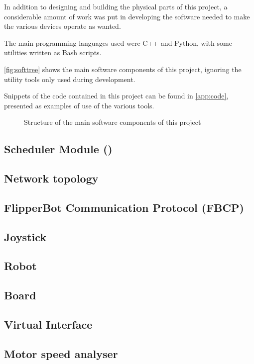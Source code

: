 In addition to designing and building the physical parts of this
project, a considerable amount of work was put in developing the
software needed to make the various devices operate as wanted.

The main programming languages used were C++ and Python, with some
utilities written as Bash scripts.

\autoref{fig:softtree} shows the main software components of this project,
ignoring the utility tools only used during development.

Snippets of the code contained in this project can be found in
\autoref{app:code}, presented as examples of use of the various tools.

\begin{figure}[htbp]
  
  \caption{Structure of the main software components of this project}
  \label{fig:softtree}
\end{figure}

\subsection{Scheduler Module (\ScheMo{})}
  \label{ssec:schemo}
  

\subsection{Network topology}
  \label{ssec:network}
  

\subsection{FlipperBot Communication Protocol (FBCP)}
  \label{ssec:fbcp}
  
  
\subsection{Joystick}
  \label{ssec:contr}
  

\subsection{Robot}
  \label{ssec:robot}
  

\subsection{Board}
  \label{ssec:board}
  
  
\subsection{Virtual Interface}
  \label{ssec:vcontr}
  

\subsection{Motor speed analyser}
  \label{ssec:motor}
  
